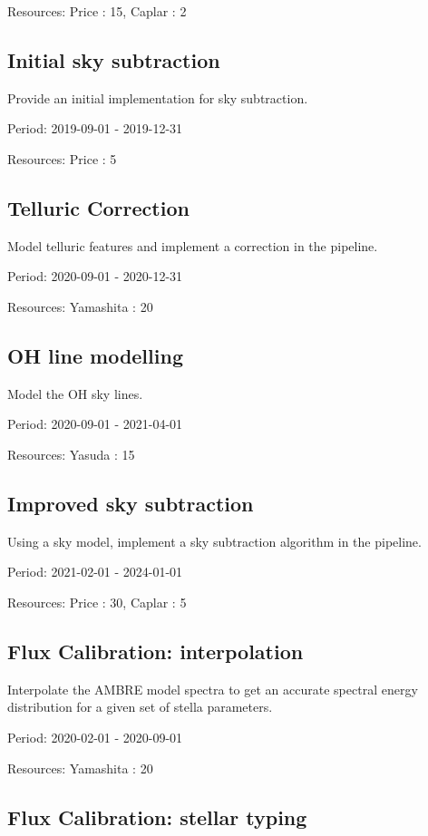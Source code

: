 Resources: Price : 15, Caplar : 2

\subsection{Initial sky subtraction}

Provide an initial implementation for sky subtraction.

Period: 2019-09-01 - 2019-12-31

Resources: Price : 5

\subsection{Telluric Correction}

Model telluric features and implement a correction in the pipeline.

Period: 2020-09-01 - 2020-12-31

Resources: Yamashita : 20

\subsection{OH line modelling}

Model the OH sky lines.

Period: 2020-09-01 - 2021-04-01

Resources: Yasuda : 15

\subsection{Improved sky subtraction}

Using a sky model, implement a sky subtraction algorithm in the pipeline.

Period: 2021-02-01 - 2024-01-01

Resources: Price : 30, Caplar : 5

\subsection{Flux Calibration: interpolation}

Interpolate the AMBRE model spectra to get an accurate spectral energy distribution for a given set of stella parameters.

Period: 2020-02-01 - 2020-09-01

Resources: Yamashita : 20

\subsection{Flux Calibration: stellar typing}

